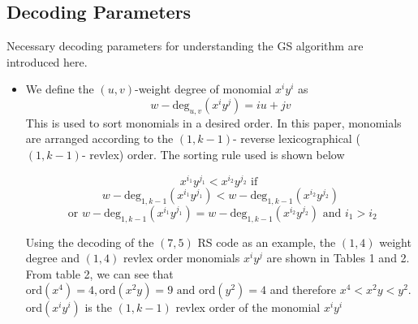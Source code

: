 \documentclass[fontsize=12pt]{article}
\begin{document}
\subsection{Decoding Parameters}
Necessary decoding parameters for understanding the GS algorithm are introduced here.
\begin{itemize}
\item We define the $(u,v)$-weight  degree of monomial $x^iy^i$ as 
\begin{equation}
w-\text{deg}_{u,v}(x^iy^j) = iu+jv
\end{equation}
This is used to sort monomials in a desired order. In this paper, monomials are arranged according to the $(1,k-1)$- reverse lexicographical ($(1,k-1)$- revlex) order. The sorting rule used is shown below


$$x^{i_1}y^{j_1} < x^{i_2}y^{j_2} \text{ if } $$
$$ w-\text{deg}_{1,k-1}(x^{i_1}y^{j_1}) < w-\text{deg}_{1,k-1}(x^{i_2}y^{j_2}) $$
$$\text{ or } w-\text{deg}_{1,k-1}(x^{i_1}y^{j_1}) = w-\text{deg}_{1,k-1}(x^{i_2}y^{j_2}) \text{ and } i_1 >i_2$$

Using the decoding of the $(7,5)$ RS code as an example, the $(1,4) $ weight degree and $(1,4)$ revlex order monomials $x^iy^j$ are shown in Tables 1 and 2. From table 2, we can see that $\text{ord}(x^4)=4,\text{ord}(x^2y)=9 \text{ and } \text{ord}(y^2)=4$ and therefore $x^4< x^2y < y^2$. ord$(x^iy^i) $ is the  $(1,k-1)$ revlex order of the monomial $x^iy^i$


\end{itemize}
\end{document}
